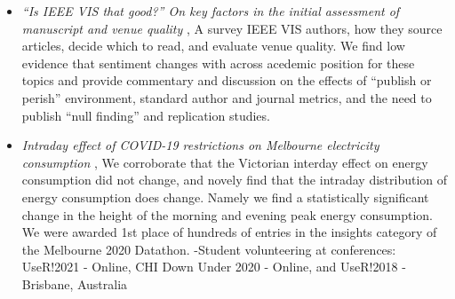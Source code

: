 \documentclass{template/monashthesis}
\begin{document}
\begin{itemize}
\tightlist
\item
  \emph{``Is IEEE VIS that good?'' On key factors in the initial assessment of manuscript and venue quality} \autocite{spyrison_is_2021}, A survey IEEE VIS authors, how they source articles, decide which to read, and evaluate venue quality. We find low evidence that sentiment changes with across acedemic position for these topics and provide commentary and discussion on the effects of ``publish or perish'' environment, standard author and journal metrics, and the need to publish ``null finding'' and replication studies.
\item
  \emph{Intraday effect of COVID-19 restrictions on Melbourne electricity consumption} \autocite{barrow_changes_2020}, We corroborate that the Victorian interday effect on energy consumption did not change, and novely find that the intraday distribution of energy consumption does change. Namely we find a statistically significant change in the height of the morning and evening peak energy consumption. We were awarded 1st place of hundreds of entries in the insights category of the Melbourne 2020 Datathon.
  -Student volunteering at conferences: UseR!2021 - Online, CHI Down Under 2020 - Online, and UseR!2018 - Brisbane, Australia
\end{itemize}

\printbibliography[heading=bibintoc]
\end{document}
